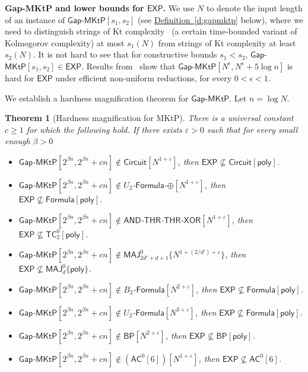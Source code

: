 \documentclass[11pt]{article}
\numberwithin{equation}{section}
\newtheorem{theorem}{Theorem}[section]
\theoremstyle{definition}
\theoremstyle{plain}
\newcommand{\expref}[2]{\hyperref[#2]{#1~\ref{#2}}}
\newcommand{\gapmktp}{\mathsf{Gap}$-$\mathsf{MKtP}}
\begin{document}
\noindent \textbf{Gap-MKtP and lower bounds for $\mathsf{EXP}$.} We use $N$ to denote the input length of an instance of $\gapmktp[s_1,s_2]$ (see \expref{Definition}{d:gapmktp} below), where we need to distinguish strings of Kt complexity~\cite{Levin84} (a certain time-bounded variant of Kolmogorov complexity) at most $s_1(N)$ from strings of Kt complexity at least $s_2(N)$. It is not hard to see that for constructive bounds $s_1 < s_2$, $\gapmktp[s_1,s_2] \in \mathsf{EXP}$. Results from~\cite{DBLP:journals/siamcomp/AllenderBKMR06} show that $\gapmktp[N^{\epsilon},N^{\epsilon}+5\log n]$ is hard for $\mathsf{EXP}$ under efficient non-uniform reductions, for every $0 < \epsilon< 1$.

We establish a hardness magnification theorem for $\gapmktp$.
Let $n = \log N$. 

\begin{theorem}[Hardness magnification for MKtP]\label{thm:magnification} There is a universal constant $c \geq 1$ for which the following hold. If there exists $\varepsilon > 0$ such that for every small enough $\beta > 0$
\vspace{0.2cm} 
\begin{itemize}
\item[\emph{1.}] $\gapmktp[2^{\beta n}, 2^{\beta n} + cn] \notin \mathsf{Circuit}[N^{1 + \varepsilon}]$, then $\mathsf{EXP} \nsubseteq \mathsf{Circuit}[\mathsf{poly}]$.
\item[\emph{2.}] $\gapmktp[2^{\beta n}, 2^{\beta n} + cn] \notin U_2$-$\mathsf{Formula}$-$\oplus[N^{1 + \varepsilon}]$, then $\mathsf{EXP} \nsubseteq \mathsf{Formula}[\mathsf{poly}]$.
\item[\emph{3.}] $\gapmktp[2^{\beta n}, 2^{\beta n} + cn] \notin \mathsf{AND}$-$\mathsf{THR}$-$\mathsf{THR}$-$\mathsf{XOR}[N^{1 + \varepsilon}]$, then $\mathsf{EXP} \nsubseteq \mathsf{TC}^0_2[\mathsf{poly}]$.
\item[\emph{4.}] $\gapmktp[2^{\beta n}, 2^{\beta n} + cn] \notin \mathsf{MAJ}^0_{2d' + d + 1}\{N^{1 + (2/d') + \varepsilon}\}$, then $\mathsf{EXP} \nsubseteq \mathsf{MAJ}^0_d\{\mathsf{poly}\}$.
\item[\emph{5.}] $\gapmktp[2^{\beta n}, 2^{\beta n} + cn] \notin B_2$-$\mathsf{Formula}[N^{2 + \varepsilon}]$, then $\mathsf{EXP} \nsubseteq \mathsf{Formula}[\mathsf{poly}]$.
\item[\emph{6.}] $\gapmktp[2^{\beta n}, 2^{\beta n} + cn] \notin U_2$-$\mathsf{Formula}[N^{3 + \varepsilon}]$, then $\mathsf{EXP} \nsubseteq \mathsf{Formula}[\mathsf{poly}]$.
\item[\emph{7.}] $\gapmktp[2^{\beta n}, 2^{\beta n} + cn] \notin \mathsf{BP}[N^{2 + \varepsilon}]$, then $\mathsf{EXP} \nsubseteq \mathsf{BP}[\mathsf{poly}]$.
\item[\emph{8.}] $\gapmktp[2^{\beta n}, 2^{\beta n} + cn] \notin (\mathsf{AC}^0[6])[N^{1 + \varepsilon}]$, then $\mathsf{EXP} \nsubseteq \mathsf{AC}^0[6]$.
\end{itemize} 
\end{theorem}
\end{document}
